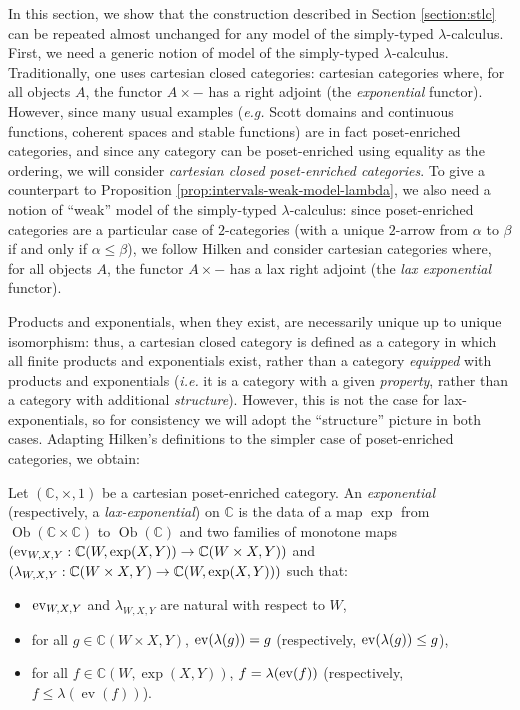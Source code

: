 In this section, we show that the construction described in Section \ref{section:stlc} can be repeated almost unchanged for any model of the simply-typed $\lambda$-calculus. First, we need a generic notion of model of the simply-typed $\lambda$-calculus. Traditionally, one uses cartesian closed categories: cartesian categories where, for all objects $A$, the functor $A \times -$ has a right adjoint (the \emph{exponential} functor). However, since many usual examples (\textit{e.g.} Scott domains and continuous functions, coherent spaces and stable functions) are in fact poset-enriched categories, and since any category can be poset-enriched using equality as the ordering, we will consider \emph{cartesian closed poset-enriched categories}. To give a counterpart to Proposition \ref{prop:intervals-weak-model-lambda}, we also need a notion of ``weak'' model of the simply-typed $\lambda$-calculus: since poset-enriched categories are a particular case of $2$-categories (with a unique $2$-arrow from $\alpha$ to $\beta$ if and only if $\alpha \leq \beta$), we follow Hilken \cite{hilken:2-lambda} and consider cartesian categories where, for all objects $A$, the functor $A \times -$ has a lax right adjoint (the \emph{lax exponential} functor).

Products and exponentials, when they exist, are necessarily unique up to unique isomorphism: thus, a cartesian closed category is defined as a category in which all finite products and exponentials exist, rather than a category \emph{equipped} with products and exponentials (\textit{i.e.} it is a category with a given \emph{property}, rather than a category with additional \emph{structure}). However, this is not the case for lax-exponentials, so for consistency we will adopt the ``structure'' picture in both cases. Adapting Hilken's definitions \cite{hilken:2-lambda} to the simpler case of poset-enriched categories, we obtain:

\begin{definition} Let $(\mathbb{C}, \times, 1)$ be a cartesian poset-enriched category. An \emph{exponential} (respectively, a \emph{lax-exponential}) on $\mathbb{C}$ is the data of a map $\exp$ from $\operatorname{Ob}(\mathbb{C} \times \mathbb{C})$ to $\operatorname{Ob}(\mathbb{C})$ and two families of monotone maps $(\operatorname{ev}_{W,X,Y} : \mathbb{C}(W, \operatorname{exp}(X,Y)) \to \mathbb{C}(W \times X, Y))$ and $(\lambda_{W,X,Y} : \mathbb{C}(W \times X, Y) \to \mathbb{C}(W, \exp(X,Y)))$ such that: \begin{itemize}
\item $\operatorname{ev}_{W,X,Y}$ and $\lambda_{W,X,Y}$ are natural with respect to $W$,
\item for all $g \in \mathbb{C}(W \times X, Y)$, $\operatorname{ev}(\lambda(g)) = g$ (respectively, $\operatorname{ev}(\lambda(g)) \leq g$),
\item for all $f \in \mathbb{C}(W, \exp(X,Y))$, $f = \lambda(\operatorname{ev}(f))$ (respectively, $f \leq \lambda(\operatorname{ev}(f))$).
\end{itemize}
\end{definition}

